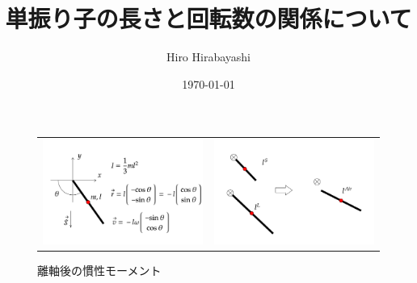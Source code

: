 \documentclass[a4paper,11pt]{jsarticle}
\begin{document}
\title{単振り子の長さと回転数の関係について}
\author{Hiro Hirabayashi}
\date{\today}
\maketitle

\begin{figure}[h]
  \begin{tabular}{cc}
    \begin{minipage}[t]{0.45\textwidth}
      \centering
      \includegraphics[width=1\textwidth]{config.png}
      \caption{設定}
      \label{config.png}
    \end{minipage} &
    \begin{minipage}[t]{0.45\textwidth}
      \centering
      \includegraphics[width=1\textwidth]{length_after_takeoff.png}
      \caption{離軸後の慣性モーメント}
      \label{length_after_takeoff.png}
    \end{minipage}
  \end{tabular}
\end{figure}
\end{document}
